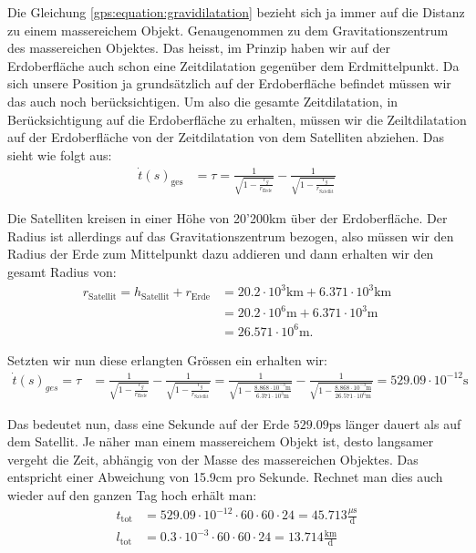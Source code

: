 \begin{refsection}
Die Gleichung \ref{gps:equation:gravidilatation} bezieht sich ja immer auf die Distanz zu einem massereichem Objekt. Genaugenommen zu dem Gravitationszentrum des massereichen Objektes. Das heisst, im Prinzip haben wir auf der Erdoberfläche auch schon eine Zeitdilatation gegenüber dem Erdmittelpunkt. Da sich unsere Position ja grundsätzlich auf der Erdoberfläche befindet müssen wir das auch noch berücksichtigen. Um also die gesamte Zeitdilatation, in Berücksichtigung auf die Erdoberfläche zu erhalten, müssen wir die Zeiltdilatation auf der Erdoberfläche von der Zeitdilatation von dem Satelliten abziehen. Das sieht wie folgt aus:
\begin{align*}
\dot t(s)_ {\text{ges}} &= \tau = \frac{1}{\sqrt{1-\frac{r_g}{r_{\text{Erde}}}}} - \frac{1}{\sqrt{1-\frac{r_g}{r_{\text{Satellit}}}}}
\end{align*}

Die Satelliten kreisen in einer Höhe von 20'200km über der Erdoberfläche. Der Radius ist allerdings auf das Gravitationszentrum bezogen, also müssen wir den Radius der Erde zum Mittelpunkt dazu addieren und dann erhalten wir den gesamt Radius von:
\begin{align*}
r_{\text{Satellit}} = h_{\text{Satellit}} + r_{\text{Erde}} & = 20.2 \cdot 10^3\text{km} + 6.371 \cdot 10^3\text{km} 
\\
& = 20.2 \cdot 10^6\text{m} + 6.371 \cdot 10^3\text{m} 
\\
& = 26.571 \cdot 10^6\text{m}.
\end{align*}

\noindent{}Setzten wir nun diese erlangten Grössen ein erhalten wir:
\begin{align*}
\dot t(s)_ {ges} = \tau & = \frac{1}{\sqrt{1-\frac{r_g}{r_\text{Erde}}}} - \frac{1}{\sqrt{1-\frac{r_g}{r_{\text{Satellit}}}}} = \frac{1}{\sqrt{1-\frac{8.868 \cdot 10^{-3}\text{m}}{ 6.371 \cdot 10^3\text{m}}}} - \frac{1}{\sqrt{1-\frac{8.868 \cdot 10^{-3}\text{m}}{ 26.571 \cdot 10^6\text{m}}}} = 529.09 \cdot 10^{-12}\text{s}
\end{align*}

\noindent{}Das bedeutet nun, dass eine Sekunde auf der Erde \( 529.09\text{ps} \) länger dauert als auf dem Satellit. Je näher man einem massereichem Objekt ist, desto langsamer vergeht die Zeit, abhängig von der Masse des massereichen Objektes. Das entspricht einer Abweichung von 15.9cm pro Sekunde. Rechnet man dies auch wieder auf den ganzen Tag hoch erhält man:
\begin{align*}
t_{\text{tot}} & = 529.09 \cdot 10^{-12} \cdot 60 \cdot 60 \cdot 24 = 45.713\frac{\mu{}\text{s}}{\text{d}}
\\
l_{\text{tot}} &= 0.3 \cdot 10^{-3} \cdot 60 \cdot 60 \cdot 24 = 13.714\frac{\text{km}}{\text{d}}
\end{align*}


\end{refsection}
